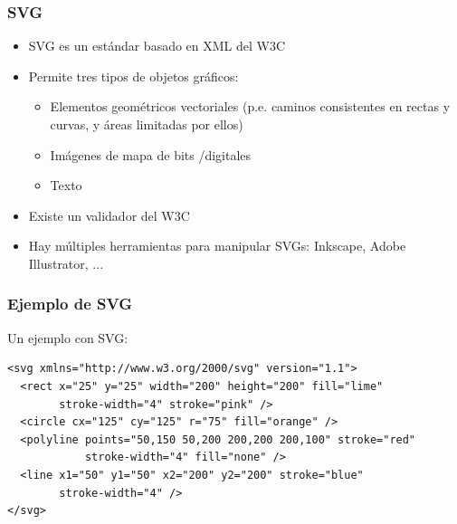 
\begin{frame}
\frametitle{SVG}

\begin{itemize}
   \item SVG es un estándar basado en XML del W3C
   \item Permite tres tipos de objetos gráficos:
   \begin{itemize}
     \item Elementos geométricos vectoriales (p.e. caminos consistentes en rectas y curvas, y áreas limitadas por ellos)
     \item Imágenes de mapa de bits /digitales
     \item Texto
   \end{itemize}
   \item Existe un validador del W3C
   \item Hay múltiples herramientas para manipular SVGs: Inkscape, Adobe Illustrator, ...
\end{itemize}

\end{frame}


\begin{frame}[fragile]
\frametitle{Ejemplo de SVG}

Un ejemplo con SVG:

\begin{footnotesize}
\begin{verbatim}
<svg xmlns="http://www.w3.org/2000/svg" version="1.1">
  <rect x="25" y="25" width="200" height="200" fill="lime"
        stroke-width="4" stroke="pink" />
  <circle cx="125" cy="125" r="75" fill="orange" />
  <polyline points="50,150 50,200 200,200 200,100" stroke="red" 
            stroke-width="4" fill="none" />
  <line x1="50" y1="50" x2="200" y2="200" stroke="blue" 
        stroke-width="4" />
</svg>
\end{verbatim}
\end{footnotesize}

\end{frame}


